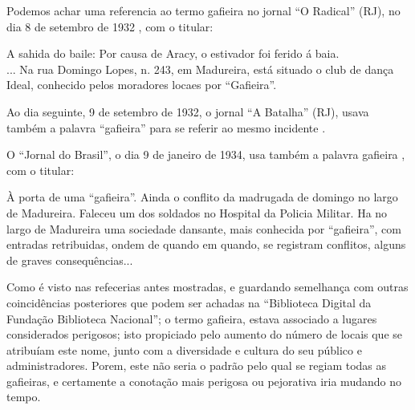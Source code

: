 
Podemos achar uma referencia ao termo gafieira no jornal ``O Radical'' (RJ),
no dia 8 de setembro de 1932 \cite[pp. 12]{gafieirajournaloradical1},
com o titular:
\begin{citando}%
A sahida do baile: Por causa de Aracy, o estivador foi ferido á baia.\\
... Na rua Domingo Lopes, n. 243, em Madureira, está situado o club de dança Ideal, 
conhecido pelos moradores locaes por ``Gafieira''.
\end{citando} 
Ao dia seguinte, 9 de setembro de 1932, o jornal ``A Batalha'' (RJ), 
usava também a palavra ``gafieira'' para se referir ao mesmo incidente \cite[pp. 8]{gafieirajournalabatalha1}.

O ``Jornal do Brasil'', o dia 9 de janeiro de 1934, 
usa também a palavra gafieira \cite[pp. 11]{gafieirajournalbrasil1}, com o titular:
\begin{citando}%
À porta de uma ``gafieira''.
Ainda o conflito da madrugada de domingo no largo de Madureira.
Faleceu um dos soldados no Hospital da Policia Militar. 
Ha no largo de Madureira uma sociedade dansante, mais conhecida por ``gafieira'', 
com entradas retribuidas, ondem de quando em quando, se registram conflitos, 
alguns de graves consequências...
\end{citando} 
Como é visto nas refecerias antes mostradas, e guardando semelhança com outras coincidências
posteriores que podem ser achadas na ``Biblioteca Digital da Fundação Biblioteca Nacional''; 
o termo gafieira, estava associado a lugares considerados perigosos;
isto propiciado pelo aumento do número de locais que se atribuíam este nome, junto com 
a diversidade e cultura  do seu público e administradores.
Porem, este não seria o padrão pelo qual se regiam todas as gafieiras, 
e certamente a conotação mais perigosa ou pejorativa iria mudando no tempo. 


